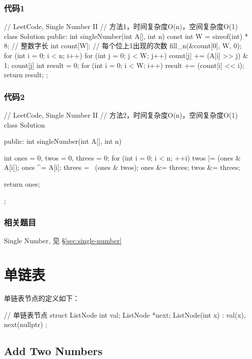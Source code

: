 \subsubsection{代码1}
\begin{Code}
// LeetCode, Single Number II
// 方法1，时间复杂度O(n)，空间复杂度O(1)
class Solution {
public:
    int singleNumber(int A[], int n) {
        const int W = sizeof(int) * 8; // 整数字长
        int count[W];  // 每个位上1出现的次数
        fill_n(&count[0], W, 0);
        for (int i = 0; i < n; i++) {
            for (int j = 0; j < W; j++) {
                count[j] += (A[i] >> j) & 1;
                count[j] %
            }
        }
        int result = 0;
        for (int i = 0; i < W; i++) {
            result += (count[i] << i);
        }
        return result;
    }
};
\end{Code}


\subsubsection{代码2}
\begin{Code}
// LeetCode, Single Number II
// 方法2，时间复杂度O(n)，空间复杂度O(1)
class Solution {
public:
    int singleNumber(int A[], int n) {
        int ones = 0, twos = 0, threes = 0;
        for (int i = 0; i < n; ++i) {
            twos |= (ones & A[i]);
            ones ^= A[i];
            threes = ~(ones & twos);
            ones &= threes;
            twos &= threes;
        }

        return ones;
    }
};
\end{Code}


\subsubsection{相关题目}
\begindot
\item  Single Number, 见 \S \ref{sec:single-number}
\myenddot


\section{单链表} %

单链表节点的定义如下：
\begin{Code}
// 单链表节点
struct ListNode {
    int val;
    ListNode *next;
    ListNode(int x) : val(x), next(nullptr) { }
};
\end{Code}


\subsection{Add Two Numbers}
\label{sec:add-two-numbers}


